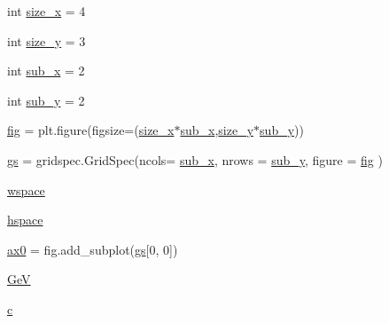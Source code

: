 \begin{DoxyCompactItemize}
int \hyperlink{namespacebackground__diffusion__coefficient__3_aa496de627bc7ba32809e91931743db41}{size\+\_\+x} = 4
\item 
int \hyperlink{namespacebackground__diffusion__coefficient__3_a06682c3c075d82efb8cd5a23c13222b0}{size\+\_\+y} = 3
\item 
int \hyperlink{namespacebackground__diffusion__coefficient__3_a62e8135e741ff9c9842eb5404a128a14}{sub\+\_\+x} = 2
\item 
int \hyperlink{namespacebackground__diffusion__coefficient__3_a3ab25d79e76e2bd1e87fec0b12065115}{sub\+\_\+y} = 2
\item 
\hyperlink{namespacebackground__diffusion__coefficient__3_a345c6968f6e40b8d3876e2ef18eb6aad}{fig} = plt.\+figure(figsize=(\hyperlink{namespacebackground__diffusion__coefficient__3_aa496de627bc7ba32809e91931743db41}{size\+\_\+x}$\ast$\hyperlink{namespacebackground__diffusion__coefficient__3_a62e8135e741ff9c9842eb5404a128a14}{sub\+\_\+x},\hyperlink{namespacebackground__diffusion__coefficient__3_a06682c3c075d82efb8cd5a23c13222b0}{size\+\_\+y}$\ast$\hyperlink{namespacebackground__diffusion__coefficient__3_a3ab25d79e76e2bd1e87fec0b12065115}{sub\+\_\+y}))
\item 
\hyperlink{namespacebackground__diffusion__coefficient__3_a30d6f837e781a9234441d0aafd73f9b6}{gs} = gridspec.\+Grid\+Spec(ncols= \hyperlink{namespacebackground__diffusion__coefficient__3_a62e8135e741ff9c9842eb5404a128a14}{sub\+\_\+x}, nrows = \hyperlink{namespacebackground__diffusion__coefficient__3_a3ab25d79e76e2bd1e87fec0b12065115}{sub\+\_\+y}, figure = \hyperlink{namespacebackground__diffusion__coefficient__3_a345c6968f6e40b8d3876e2ef18eb6aad}{fig} )
\item 
\hyperlink{namespacebackground__diffusion__coefficient__3_af762266bdb9a1abd5bcc558de75845c6}{wspace}
\item 
\hyperlink{namespacebackground__diffusion__coefficient__3_aefcba440eaa69b2607c11262f44c099e}{hspace}
\item 
\hyperlink{namespacebackground__diffusion__coefficient__3_adb5d0453900011b0e2ecb97b348df19d}{ax0} = fig.\+add\+\_\+subplot(\hyperlink{namespacebackground__diffusion__coefficient__3_a30d6f837e781a9234441d0aafd73f9b6}{gs}\mbox{[}0, 0\mbox{]})
\item 
\hyperlink{namespacebackground__diffusion__coefficient__3_a7558be3411c500a689c600ae94f9d7ee}{GeV}
\item 
\hyperlink{namespacebackground__diffusion__coefficient__3_a696b33c91f8ef538604e802685230978}{c}
\item 

\end{DoxyCompactItemize}
